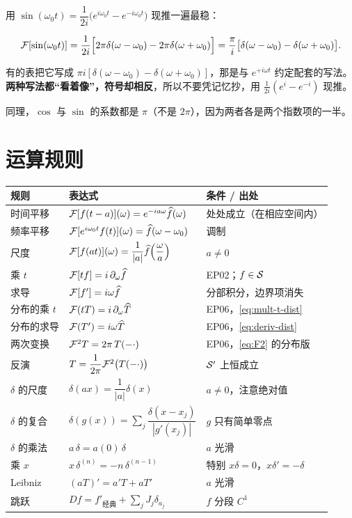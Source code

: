 \begin{notebox}
用 $\sin(\omega_0t)=\dfrac{1}{2i}\big(e^{i\omega_0t}-e^{-i\omega_0t}\big)$ 现推一遍最稳：

\begin{equation}
\mathcal{F}[\sin(\omega_0 t)]
=\frac{1}{2i}\Big[2\pi\delta(\omega-\omega_0)-2\pi\delta(\omega+\omega_0)\Big]
=\frac{\pi}{i}\big[\delta(\omega-\omega_0)-\delta(\omega+\omega_0)\big].
\end{equation}

有的表把它写成 $\pi i[\delta(\omega-\omega_0)-\delta(\omega+\omega_0)]$，那是与 $e^{+i\omega t}$ 约定配套的写法。\textbf{两种写法都“看着像”，符号却相反}，所以不要凭记忆抄，用 $\frac{1}{2i}(e^{i}-e^{-i})$ 现推。

同理，$\cos$ 与 $\sin$ 的系数都是 $\pi$（不是 $2\pi$），因为两者各是两个指数项的一半。
\end{notebox}

\section{运算规则}

\begin{center}
\small
\renewcommand{\arraystretch}{1.5}
\begin{tabularx}{\textwidth}{@{}L{6.4cm}L{5.4cm}Y@{}}
\toprule
规则 & 表达式 & 条件 / 出处 \\
\midrule
时间平移 & $\mathcal{F}[f(t-a)](\omega)=e^{-ia\omega}\widehat{f}(\omega)$ & 处处成立（在相应空间内） \\
频率平移 & $\mathcal{F}[e^{i\omega_0t}f(t)](\omega)=\widehat{f}(\omega-\omega_0)$ & 调制 \\
尺度 & $\mathcal{F}[f(at)](\omega)=\dfrac{1}{|a|}\widehat{f}\!\left(\dfrac{\omega}{a}\right)$ & $a\neq0$ \\
乘 $t$ & $\mathcal{F}[tf]=i\,\partial_\omega\widehat{f}$ & EP02；$f\in\mathcal{S}$ \\
求导 & $\mathcal{F}[f']=i\omega\widehat{f}$ & 分部积分，边界项消失 \\
分布的乘 $t$ & $\mathcal{F}(tT)=i\,\partial_\omega\widehat T$ & EP06，\eqref{eq:mult-t-dist} \\
分布的求导 & $\mathcal{F}(T')=i\omega\widehat T$ & EP06，\eqref{eq:deriv-dist} \\
两次变换 & $\mathcal{F}^{2}T=2\pi\,T(-\cdot)$ & EP06，\eqref{eq:F2} 的分布版 \\
反演 & $T=\dfrac{1}{2\pi}\mathcal{F}^{2}\big(T(-\cdot)\big)$ & $\mathcal{S}'$ 上恒成立 \\
\midrule
$\delta$ 的尺度 & $\delta(ax)=\dfrac{1}{|a|}\delta(x)$ & $a\neq0$，注意绝对值 \\
$\delta$ 的复合 & $\delta(g(x))=\sum_j\dfrac{\delta(x-x_j)}{|g'(x_j)|}$ & $g$ 只有简单零点 \\
$\delta$ 的乘法 & $a\,\delta=a(0)\,\delta$ & $a$ 光滑 \\
乘 $x$ & $x\,\delta^{(n)}=-n\,\delta^{(n-1)}$ & 特别 $x\delta=0$，$x\delta'=-\delta$ \\
Leibniz & $(aT)'=a'T+aT'$ & $a$ 光滑 \\
跳跃 & $Df=f'_{\text{经典}}+\sum_j J_j\delta_{a_j}$ & $f$ 分段 $C^1$ \\
\bottomrule
\end{tabularx}
\end{center}

